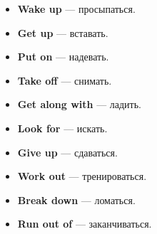 \documentclass[12pt, a4paper]{article}
\begin{document}
\begin{boxpurple}[title=Итоговый чек-лист: 10 глаголов для запоминания]
\begin{minipage}{0.48\textwidth}
\begin{itemize}
    \item \textbf{Wake up} — просыпаться.
    \item \textbf{Get up} — вставать.
    \item \textbf{Put on} — надевать.
    \item \textbf{Take off} — снимать.
    \item \textbf{Get along with} — ладить.
\end{itemize}
\end{minipage}
\hfill
\begin{minipage}{0.48\textwidth}
\begin{itemize}
    \item \textbf{Look for} — искать.
    \item \textbf{Give up} — сдаваться.
    \item \textbf{Work out} — тренироваться.
    \item \textbf{Break down} — ломаться.
    \item \textbf{Run out of} — заканчиваться.
\end{itemize}
\end{minipage}
\end{boxpurple}
\end{document}
